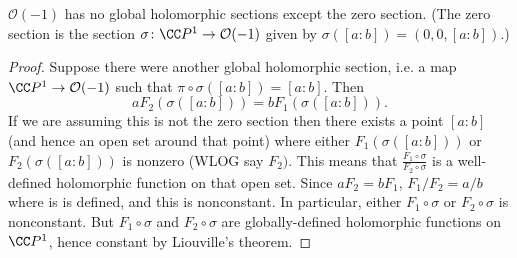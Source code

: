 \documentclass{amsart}
\begin{document}
\begin{Lemma}[lmatautbun]
$\mathcal{O}(-1)$ has no global holomorphic sections except the zero section. (The zero section is the section $\sigma\colon\CC P^1\to\mathcal{O}(-1)$ given by $\sigma([a:b])=(0,0,[a:b])$.)
\end{Lemma}
\begin{proof}
Suppose there were another global holomorphic section, i.e. a map $\CC P^1\to \mathcal{O}(-1)$ such that $\pi\circ\sigma([a:b])=[a:b]$. Then
\[aF_2(\sigma([a:b]))=bF_1(\sigma([a:b])).\]
If we are assuming this is not the zero section then there exists a point $[a:b]$ (and hence an open set around that point) where either $F_1(\sigma([a:b]))$ or $F_2(\sigma([a:b]))$ is nonzero (WLOG say $F_2)$. This means that $\frac{F_1\circ\sigma}{F_2\circ\sigma}$ is a well-defined holomorphic function on that open set. Since $aF_2=bF_1$, $F_1/F_2=a/b$ where is is defined, and this is nonconstant. In particular, either $F_1\circ\sigma$ or $F_2\circ\sigma$ is nonconstant. But $F_1\circ\sigma$ and $F_2\circ\sigma$ are globally-defined holomorphic functions on $\CC P^1$, hence constant by Liouville's theorem.
\end{proof}
\end{document}
